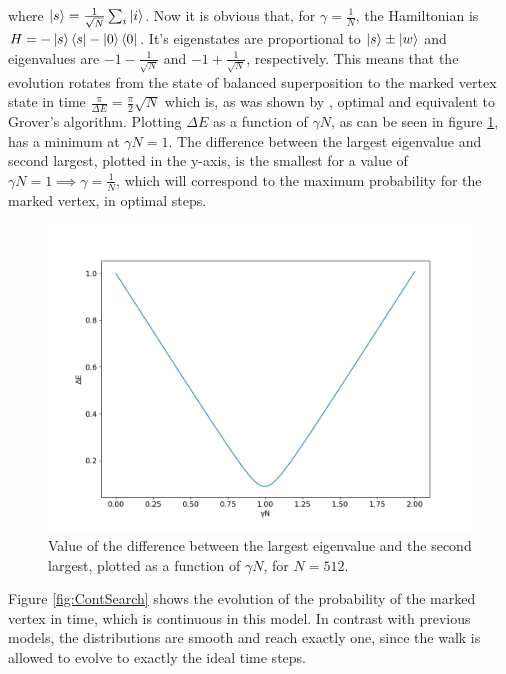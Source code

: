                 where $\ket{s} = \frac{1}{\sqrt{N}}\sum_i \ket{i}$. Now it is obvious that, for $\gamma = \frac{1}{N}$, the Hamiltonian is $H = -\ket{s}\bra{s} - \ket{0}\bra{0}$. It's eigenstates are proportional to $\ket{s}\pm\ket{w}$ and eigenvalues are $-1 - \frac{1}{\sqrt{N}}$ and $-1 + \frac{1}{\sqrt{N}}$, respectively. This means that the evolution rotates from the state of balanced superposition to the marked vertex state in time $\frac{\pi}{\Delta E} = \frac{\pi}{2}\sqrt{N}$ which is, as was shown by \cite{zalka1999}, optimal and equivalent to Grover's algorithm. Plotting $\Delta E$ as a function of $\gamma N$, as can be seen in figure \ref{fig:gamma512}, has a minimum at $\gamma N =1$. The difference between the largest eigenvalue and second largest, plotted in the y-axis, is the smallest for a value of $\gamma N = 1 \implies \gamma =\frac{1}{N}$, which will correspond to the maximum probability for the marked vertex, in optimal steps.
                
                \begin{figure}[h]
                    \centering \includegraphics[scale=0.40]{img/ContQW/search/gamma512.png}
                     \caption{Value of the difference between the largest eigenvalue and the second largest, plotted as a function of $\gamma N$, for $N=512$. }\label{fig:ContSearch}
                     \label{fig:gamma512}
                \end{figure}
                
                Figure \ref{fig:ContSearch} shows the evolution of the probability of the marked vertex in time, which is continuous in this model. In contrast with previous models, the distributions are smooth and reach exactly one, since the walk is allowed to evolve to exactly the ideal time steps.
                
